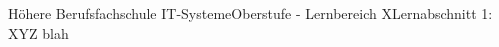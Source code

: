 \documentclass[11pt,oneside,openany,headings=optiontotoc,11pt,numbers=noenddot]{article}
\begin{document}
	\begin{worksheet}{Höhere Berufsfachschule IT-Systeme}{Oberstufe - Lernbereich X}{Lernabschnitt 1: XYZ}
		\setlength{\columnseprule}{0pt}
		blah
	\end{worksheet}
\end{document}
